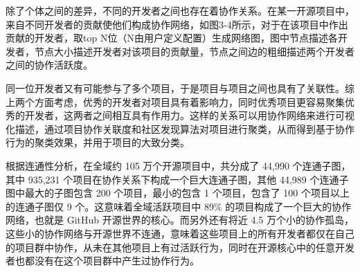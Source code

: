 \par 除了个体之间的差异，不同的开发者之间也存在着协作关系\cite{廖志芳2019github开源软件开发过程中关键用户行为分析}。在某一开源项目中，来自不同开发者的贡献使他们构成协作网络，如图3-4所示，对于在该项目中作出贡献的开发者，取top N位（N由用户定义配置）生成网络图，图中节点描述各开发者，节点大小描述开发者对该项目的贡献量，节点之间边的粗细描述两个开发者之间的协作活跃度\cite{thung2013network}。

\par 同一位开发者又有可能参与了多个项目，于是项目与项目之间也具有了关联性。综上两个方面考虑，优秀的开发者对项目具有着影响力，同时优秀项目更容易聚集优秀的开发者，这两者之间相互具有作用力。这样的关系可以用协作网络来进行可视化描述，通过项目协作关联度和社区发现算法对项目进行聚类，从而得到基于协作行为的聚类效果，并用于项目的大致分类。

\par 根据连通性分析，在全域约 105 万个开源项目中，共分成了 44,990 个连通子图，其中 935,231 个项目在协作关系下构成一个巨大连通子图，其他 44,989 个连通子图中最大的子图包含 200 个项目，最小的包含 1 个项目，包含了 100 个项目以上的连通子图仅 9 个。这意味着全域活跃项目中 89\% 的项目构成了一个巨大的协作网络，也就是 GitHub 开源世界的核心。而另外还有将近 4.5 万个小的协作孤岛，这些小的协作网络与开源世界不连通，意味着这些项目上的所有开发者都仅在自己的项目群中协作，从未在其他项目上有过活跃行为，同时在开源核心中的任意开发者也都没有在这个项目群中产生过协作行为\cite{刘玉辉2018github}。


